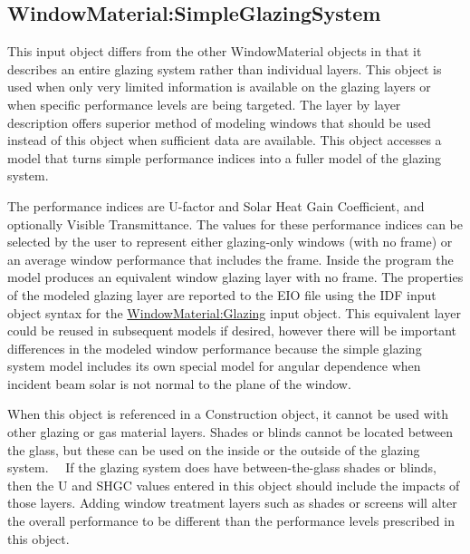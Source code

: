 \subsection{WindowMaterial:SimpleGlazingSystem}\label{windowmaterialsimpleglazingsystem}


This input object differs from the other WindowMaterial objects in that it describes an entire glazing system rather than individual layers. This object is used when only very limited information is available on the glazing layers or when specific performance levels are being targeted. The layer by layer description offers superior method of modeling windows that should be used instead of this object when sufficient data are available. This object accesses a model that turns simple performance indices into a fuller model of the glazing system.

The performance indices are U-factor and Solar Heat Gain Coefficient, and optionally Visible Transmittance. The values for these performance indices can be selected by the user to represent either glazing-only windows (with no frame) or an average window performance that includes the frame. Inside the program the model produces an equivalent window glazing layer with no frame. The properties of the modeled glazing layer are reported to the EIO file using the IDF input object syntax for the \hyperref[windowmaterialglazing]{WindowMaterial:Glazing} input object. This equivalent layer could be reused in subsequent models if desired, however there will be important differences in the modeled window performance because the simple glazing system model includes its own special model for angular dependence when incident beam solar is not normal to the plane of the window.

When this object is referenced in a Construction object, it cannot be used with other glazing or gas material layers. Shades or blinds cannot be located between the glass, but these can be used on the inside or the outside of the glazing system.~~ If the glazing system does have between-the-glass shades or blinds, then the U and SHGC values entered in this object should include the impacts of those layers. Adding window treatment layers such as shades or screens will alter the overall performance to be different than the performance levels prescribed in this object.

